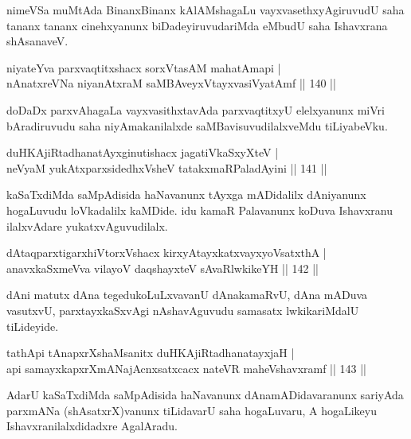 \begin{artha}
nimeVSa muMtAda BinanxBinanx kAlAMshagaLu vayxvasethxyAgiruvudU saha tananx tananx cinehxyanunx biDadeyiruvudariMda eMbudU saha Ishavxrana shAsanaveV.
\end{artha}


\begin{shl}
niyateYva parxvaqtitxshacx sorxVtasAM mahatAmapi |\\
nAnatxreVNa niyanAtxraM saMBAveyxVtayxvasiVyatAmf \hfill || 140 ||
\end{shl}

\begin{artha}
doDaDx parxvAhagaLa vayxvasithxtavAda parxvaqtitxyU elelxyanunx miVri bAradiruvudu saha niyAmakanilalxde saMBavisuvudilalxveMdu tiLiyabeVku.
\end{artha}

\begin{shl}
duHKAjiRtadhanatAyxginutishacx jagatiVkaSxyXteV |\\
neVyaM yukAtx\s parxsidedhxVsheV tatakxmaRPaladAyini \hfill || 141 ||
\end{shl}

\begin{artha}
kaSaTxdiMda saMpAdisida haNavanunx tAyxga mADidalilx dAniyanunx hogaLuvudu loVkadalilx kaMDide. idu kamaR Palavanunx koDuva Ishavxranu ilalxvAdare yukatxvAguvudilalx.
\end{artha}


\begin{shl}
dAtaqparxtigarxhiVtorxVshacx kirxyAtayxkatxvayxyoVsatxthA |\\
anavxkaSxmeVva vilayoV daqshayxteV sAvaRlwkikeYH \hfill || 142 ||
\end{shl}

\begin{artha}
dAni matutx dAna tegedukoLuLxvavanU dAnakamaRvU, dAna mADuva vasutxvU, parxtayxkaSxvAgi nAshavAguvudu samasatx lwkikariMdalU tiLideyide.
\end{artha}

\begin{shl}
tathA\s pi tAnapxrXshaMsanitx duHKAjiRtadhanatayxjaH |\\
api samayxkapxrXmANajAcnxsatxcacx nateVR maheVshavxramf \hfill || 143 ||
\end{shl}

\begin{artha}%
AdarU kaSaTxdiMda saMpAdisida haNavanunx dAnamADidavaranunx sariyAda parxmANa (shAsatxrX)vanunx tiLidavarU saha hogaLuvaru, A hogaLikeyu Ishavxranilalxdidadxre AgalAradu.
\end{artha}

